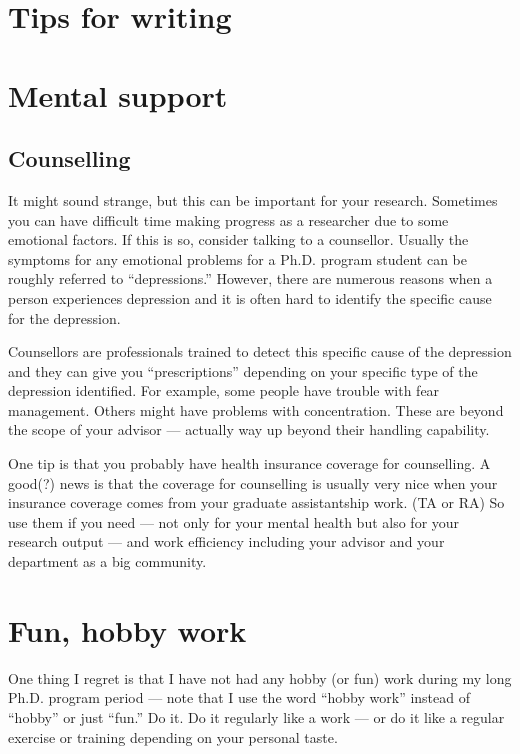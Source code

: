 \documentclass[11pt]{article}
\begin{document}
\section{Tips for writing}



\section{Mental support}

\subsection{Counselling}
It might sound strange, but this can be important for your research.
Sometimes you can have difficult time making progress as a researcher due to
some emotional factors. If this is so, consider talking to a counsellor.
Usually the symptoms for any emotional problems for a Ph.D.  program student
can be roughly referred to ``depressions.'' However, there are numerous
reasons when a person experiences depression and it is often hard to identify
the specific cause for the depression.

Counsellors are professionals trained to detect this specific cause of the
depression and they can give you ``prescriptions'' depending on your specific
type of the depression identified. For example, some people have trouble with
fear management. Others might have problems with concentration. These are
beyond the scope of your advisor --- actually way up beyond their handling
capability.

One tip is that you probably have health insurance coverage for counselling. A
good(?) news is that the coverage for counselling is usually very nice when
your insurance coverage comes from your graduate assistantship work. (TA or
RA) So use them if you need --- not only for your mental health but also for
your research output --- and work efficiency including your advisor and
your department as a big community.

\section{Fun, hobby work}

One thing I regret is that I have not had any hobby (or fun) work during my
long Ph.D. program period --- note that I use the word ``hobby work'' instead
of ``hobby'' or just ``fun.'' Do it. Do it regularly like a work --- or do it
like a regular exercise or training depending on your personal taste.
\end{document}
